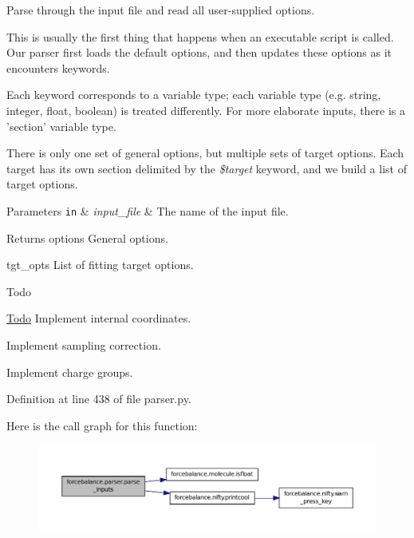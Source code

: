 Parse through the input file and read all user-\/supplied options. 

This is usually the first thing that happens when an executable script is called. Our parser first loads the default options, and then updates these options as it encounters keywords.

Each keyword corresponds to a variable type; each variable type (e.\-g. string, integer, float, boolean) is treated differently. For more elaborate inputs, there is a 'section' variable type.

There is only one set of general options, but multiple sets of target options. Each target has its own section delimited by the {\itshape \$target} keyword, and we build a list of target options.


\begin{DoxyParams}[1]{Parameters}
\mbox{\tt in}  & {\em input\-\_\-file} & The name of the input file. \\
\hline
\end{DoxyParams}
\begin{DoxyReturn}{Returns}
options General options. 

tgt\-\_\-opts List of fitting target options.
\end{DoxyReturn}
\begin{DoxyRefDesc}{Todo}
\item[\hyperlink{todo__todo000016}{Todo}]Implement internal coordinates. 

Implement sampling correction. 

Implement charge groups. \end{DoxyRefDesc}


Definition at line 438 of file parser.\-py.



Here is the call graph for this function\-:
\nopagebreak
\begin{figure}[H]
\begin{center}
\leavevmode
\includegraphics[width=350pt]{namespaceforcebalance_1_1parser_ac184c809737a27f35530020322431f7c_cgraph}
\end{center}
\end{figure}


